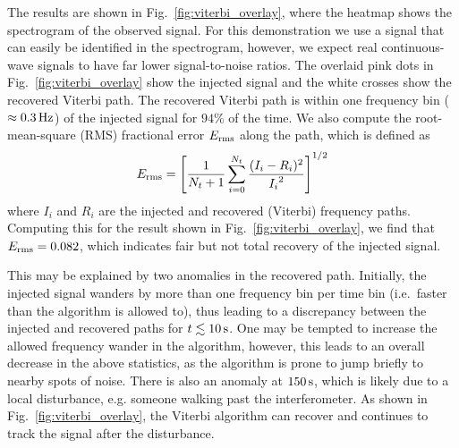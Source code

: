\documentclass[paper-main.tex]{subfiles}
\begin{document}
The results are shown in Fig.~\ref{fig:viterbi_overlay}, where the heatmap shows the spectrogram of the observed signal. 
For this demonstration we use a signal that can easily be identified in the spectrogram, however, we expect real continuous-wave signals to have far lower signal-to-noise ratios. 
The overlaid pink dots in Fig.~\ref{fig:viterbi_overlay} show the injected signal and the white crosses show the recovered Viterbi path.
The recovered Viterbi path is within one frequency bin ($\approx 0.3\,{\rm Hz}$) of the injected signal for $94\%$ of the time. We also compute the root-mean-square (RMS) fractional error $E_{\rm rms}$ along the path, which is defined as 
\begin{equation}
E_{\rm rms} = \left[ \frac{1}{N_t+1} \sum_{i=0}^{N_t} \frac{(I_i - R_i)^2}{{I_i}^2} \right] ^{1/2}
\end{equation}
where $I_i$ and $R_i$ are the injected and recovered (Viterbi) frequency paths. Computing this for the result shown in Fig.~\ref{fig:viterbi_overlay}, we find that $E_{\rm rms} = 0.082$, which indicates fair but not total recovery of the injected signal.


This may be explained by two anomalies in the recovered path. Initially, the injected signal wanders by more than one frequency bin per time bin (i.e.\ faster than the algorithm is allowed to), thus leading to a discrepancy between the injected and recovered paths for $t\lesssim 10\,{\rm s}$. One may be tempted to increase the allowed frequency wander in the algorithm, however, this leads to an overall decrease in the above statistics, as the algorithm is prone to jump briefly to nearby spots of noise. There is also an anomaly at $150\,{\rm s}$, which is likely due to a local disturbance, e.g. someone walking past the interferometer. 
As shown in Fig.~\ref{fig:viterbi_overlay}, the Viterbi algorithm can recover and continues to track the signal after the disturbance. 
\end{document}
